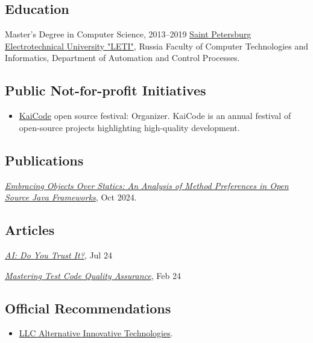 \documentclass{vl}
\begin{document}
    \subsection*{Education}
    \begin{samepage}
        Master's Degree in Computer Science, 2013--2019\newline
        \href{https://etu.ru/en/university/}{Saint Petersburg Electrotechnical University "LETI"}, Russia\newline
        Faculty of Computer Technologies and Informatics, Department of Automation and Control Processes.
    \end{samepage}

    \subsection*{Public Not-for-profit Initiatives}
    \begin{itemize}
        \item \href{https://www.kaicode.org}{KaiCode} open source festival: Organizer.
        KaiCode is an annual festival of open-source projects highlighting high-quality development.
    \end{itemize}

    \subsection*{Publications}
    \begin{samepage}
        \emph{\href{https://arxiv.org/abs/2410.05631}{Embracing Objects Over Statics: An Analysis of Method Preferences
        in Open Source Java Frameworks}}, Oct 2024.
    \end{samepage}

    \subsection*{Articles}
    \begin{samepage}
        \emph{\href{https://dzone.com/articles/ai-do-you-trust-it}{AI: Do You Trust It?}}, Jul 24
    \end{samepage}
    \begin{samepage}
        \emph{\href{https://dzone.com/articles/mastering-test-code-quality-assurance}{Mastering Test Code Quality
        Assurance}}, Feb 24
    \end{samepage}

    \subsection*{Official Recommendations}
    \begin{itemize}
        \item \href{https://github.com/volodya-lombrozo/volodya-lombrozo.github.io/blob/24eb2bbed8fac71c90ddef6ff4d93de8fb4f9f26/_cv/recommendations/letter_of_recommendation_ait.pdf}{LLC Alternative Innovative Technologies}.
    \end{itemize}
\end{document}
